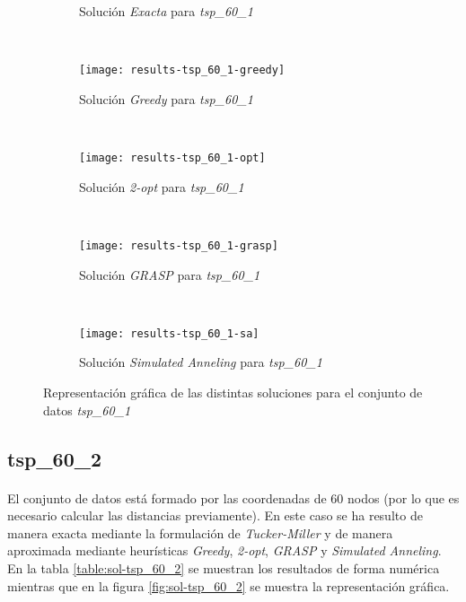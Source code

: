 \documentclass[spanish]{article}
\begin{document}
			\begin{figure}[h]
				\centering
				\begin{subfigure}{.4\textwidth}
					\centering
					\caption{Solución \emph{Exacta} para \emph{tsp\_60\_1}}
				\end{subfigure} \
				\begin{subfigure}{.4\textwidth}
					\centering
					\texttt{[image: results-tsp\_60\_1-greedy]}
					\caption{Solución \emph{Greedy} para \emph{tsp\_60\_1}}
				\end{subfigure} \\
				\begin{subfigure}{.4\textwidth}
					\centering
					\texttt{[image: results-tsp\_60\_1-opt]}
					\caption{Solución \emph{2-opt} para \emph{tsp\_60\_1}}
				\end{subfigure} \
				\begin{subfigure}{.4\textwidth}
					\centering
					\texttt{[image: results-tsp\_60\_1-grasp]}
					\caption{Solución \emph{GRASP} para \emph{tsp\_60\_1}}
				\end{subfigure} \\
				\begin{subfigure}{.4\textwidth}
					\centering
					\texttt{[image: results-tsp\_60\_1-sa]}
					\caption{Solución \emph{Simulated Anneling} para \emph{tsp\_60\_1}}
				\end{subfigure}
				\caption{Representación gráfica de las distintas soluciones para el conjunto de datos \emph{tsp\_60\_1}}
				\label{fig:sol-tsp_60_1}
			\end{figure}


		\subsection{tsp\_60\_2}

			\paragraph{}
			El conjunto de datos está formado por las coordenadas de $60$ nodos (por lo que es necesario calcular las distancias previamente). En este caso se ha resulto de manera exacta mediante la formulación de \emph{Tucker-Miller} y de manera aproximada mediante heurísticas \emph{Greedy}, \emph{2-opt}, \emph{GRASP} y \emph{Simulated Anneling}. En la tabla \ref{table:sol-tsp_60_2} se muestran los resultados de forma numérica mientras que en la figura \ref{fig:sol-tsp_60_2} se muestra la representación gráfica.
\end{document}
